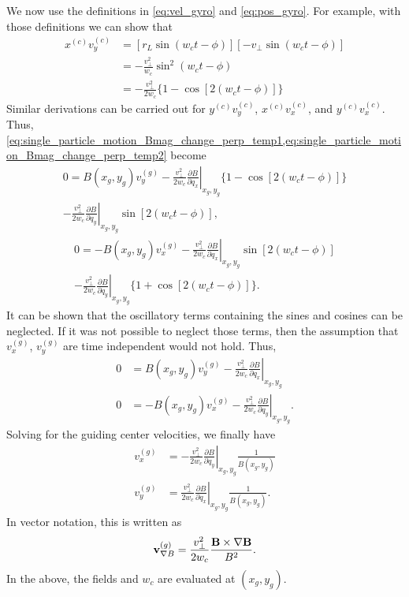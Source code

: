 \documentclass[oneside,a4paper,11pt]{report}
\begin{document}
We now use the definitions in \cref{eq:vel_gyro} and \cref{eq:pos_gyro}. For example, with those definitions we can show that 
\begin{align}
     x^{(c)} v_y^{(c)} &= \left[ r_L \sin (w_c t - \phi) \right] \left[ -v_\perp \sin (w_ct - \phi) \right] \nonumber \\
    & = -\frac{ v^2_\perp}{w_c} \sin^2(w_c t - \phi) \nonumber \\
    & = -\frac{ v^2_\perp}{2 w_c} \{1 - \cos [ 2 (w_c t - \phi)] \}
\end{align}
Similar derivations can be carried out for $y^{(c)} v_y^{(c)}$, $x^{(c)} v_x^{(c)}$, and $y^{(c)} v_x^{(c)}$. Thus, \cref{eq:single_particle_motion_Bmag_change_perp_temp1,eq:single_particle_motion_Bmag_change_perp_temp2} become 
\begin{multline}
    0 = B(x_g,y_g) v_y^{(g)} -\frac{ v^2_\perp}{2 w_c} \left . \frac{\partial B}{\partial q_x} \right |_{x_g,y_g} \{1 - \cos [ 2 (w_c t - \phi)] \} \\
    - \frac{ v^2_\perp}{2 w_c} \left .\frac{\partial B}{\partial q_y} \right |_{x_g,y_g} \sin [ 2(w_ct - \phi)],
\end{multline}
\begin{multline}
    0 = -B(x_g,y_g) v_x^{(g)} -\frac{ v^2_\perp}{2 w_c} \left . \frac{\partial B}{\partial q_x} \right |_{x_g,y_g} \sin [ 2 (w_c t - \phi)] \\
    - \frac{ v^2_\perp}{2 w_c} \left .\frac{\partial B}{\partial q_y} \right |_{x_g,y_g} \{ 1 + \cos [ 2(w_ct - \phi)] \}.
\end{multline}
It can be shown that the oscillatory terms containing the sines and cosines can be neglected. If it was not possible to neglect those terms, then the assumption that $v^{(g)}_x$, $v^{(g)}_y$ are time independent would not hold. Thus,
\begin{subequations}
\begin{alignat}{2}
    0 &= B(x_g,y_g) v_y^{(g)} - \frac{ v^2_\perp}{2 w_c} \left . \frac{\partial B}{\partial q_x} \right |_{x_g,y_g} \nonumber \\
    0 &= -B(x_g,y_g) v_x^{(g)} -\frac{ v^2_\perp}{2 w_c} \left . \frac{\partial B}{\partial q_y} \right |_{x_g,y_g} . 
\end{alignat}
\end{subequations}
Solving for the guiding center velocities, we finally have
\begin{align}
    v_x^{(g)} &= -\frac{v^2_\perp}{2 w_c} \left . \frac{\partial B}{\partial q_y} \right |_{x_g,y_g} \frac{1}{B(x_g,y_g)} \nonumber \\
    v_y^{(g)} &= \frac{v^2_\perp}{2 w_c} \left . \frac{\partial B}{\partial q_x} \right |_{x_g,y_g} \frac{1}{B(x_g,y_g)} . 
\end{align}
In vector notation, this is written as
\begin{equation}
    \mathbf{v}^{(g)}_{\nabla B} = \frac{v^2_\perp}{2 w_c} \frac{ \mathbf{B} \times \nabla \mathbf{B} }{B^2}.
\end{equation}
In the above, the fields and $w_c$ are evaluated at $(x_g,y_g)$.
\end{document}
